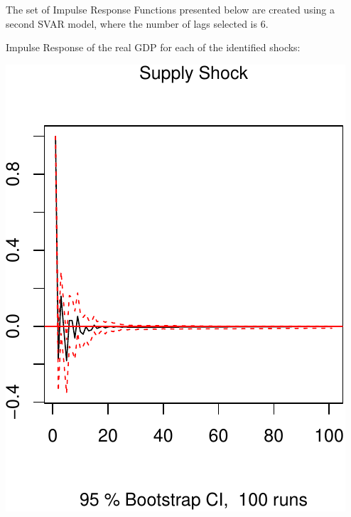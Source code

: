 \documentclass[11pt,preprint, authoryear]{elsarticle}
\numberwithin{equation}{section}
\numberwithin{figure}{section}
\numberwithin{table}{section}
\begin{document}
The set of Impulse Response Functions presented below are created using
a second SVAR model, where the number of lags selected is 6.

Impulse Response of the real GDP for each of the identified shocks:

\includegraphics{TS_proj_files/figure-latex/unnamed-chunk-30-1.pdf}
\end{document}

